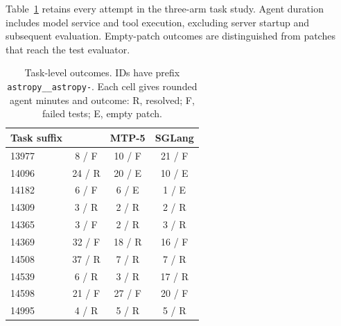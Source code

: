 Table~\ref{tab:swe-tasks} retains every attempt in the three-arm task study. Agent duration includes model service and tool execution, excluding server startup and subsequent evaluation. Empty-patch outcomes are distinguished from patches that reach the test evaluator.

\begin{table}[!htbp]
\caption{Task-level outcomes. IDs have prefix \texttt{astropy\_\_astropy-}. Each cell gives rounded agent minutes and outcome: R, resolved; F, failed tests; E, empty patch.}
\label{tab:swe-tasks}
\centering\small
\begin{tabular}{@{}lccc@{}}
\toprule
Task suffix & \sys{} & MTP-5 & SGLang \\
\midrule
13977 & 8 / F & 10 / F & 21 / F \\
14096 & 24 / R & 20 / E & 10 / E \\
14182 & 6 / F & 6 / E & 1 / E \\
14309 & 3 / R & 2 / R & 2 / R \\
14365 & 3 / F & 2 / R & 3 / R \\
14369 & 32 / F & 18 / R & 16 / F \\
14508 & 37 / R & 7 / R & 7 / R \\
14539 & 6 / R & 3 / R & 17 / R \\
14598 & 21 / F & 27 / F & 20 / F \\
14995 & 4 / R & 5 / R & 5 / R \\
\bottomrule
\end{tabular}
\end{table}

